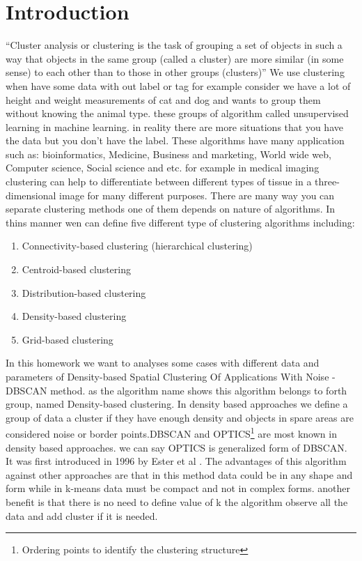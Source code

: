 \section{Introduction}
``Cluster analysis or clustering is the task of grouping a set of objects in such a way that objects in the same group (called a cluster) are more similar (in some sense) to each other than to those in other groups (clusters)''\cite{enwiki:1005655155}
\newline
We use clustering when have some data with out label or tag for example consider we have a lot of height and weight measurements of cat and dog and wants to group them without knowing the animal type. these groups of algorithm called unsupervised learning in machine learning. in reality there are more situations that you have the data but you don't have the label.
\newline
These algorithms have many application such as: bioinformatics, Medicine, Business and marketing, World wide web, Computer science, Social science and etc. for example in medical imaging clustering can help to differentiate between different types of tissue in a three-dimensional image for many different purposes\cite{filipovych2011semi}.
There are many way you can separate clustering methods one of them depends on nature of algorithms.
In thins manner wen can define five different type of clustering algorithms including:
\begin{enumerate}
	\item Connectivity-based clustering (hierarchical clustering)
	\item Centroid-based clustering
	\item Distribution-based clustering
	\item Density-based clustering
	\item Grid-based clustering
\end{enumerate}
In this homework we want to analyses some cases with different data and parameters of Density-based Spatial Clustering Of Applications With Noise - DBSCAN method. as the algorithm name shows this algorithm belongs to forth group, named Density-based clustering.
\newline
In density based approaches we define a group of data a cluster if they have enough density and objects in spare areas are considered noise or border points.DBSCAN and OPTICS\footnote{Ordering points to identify the clustering structure} are most known in density based approaches. we can say OPTICS is generalized form of DBSCAN.
\newline
It was first introduced in 1996 by Ester et al \cite{ester1996density}.
The advantages of this algorithm against other approaches are that in this method data could be in any shape and form while in k-means data must be compact and not in complex forms. another benefit is that there is no need to define value of k the algorithm observe all the data and add cluster if it is needed.